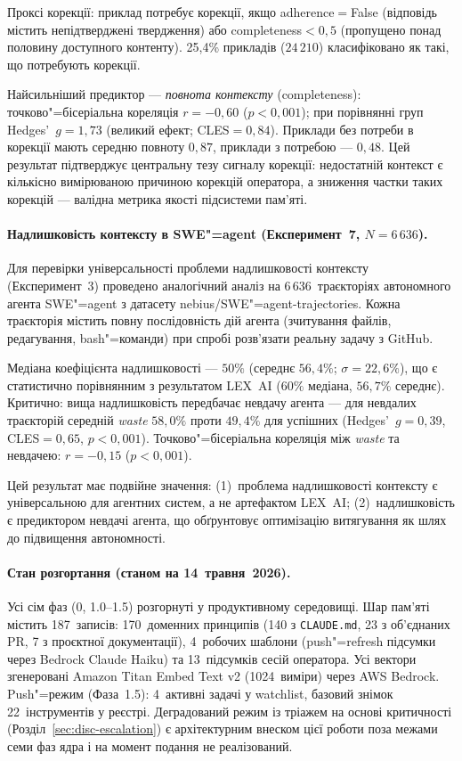 \documentclass[11pt]{article}
\begin{document}
Проксі корекції: приклад потребує корекції, якщо adherence${=}$False (відповідь містить непідтверджені твердження) або completeness${<}0{,}5$ (пропущено понад половину доступного контенту).
25{,}4\% прикладів ($24\,210$) класифіковано як такі, що потребують корекції.

Найсильніший предиктор --- \emph{повнота контексту} (completeness): точково"=бісеріальна кореляція $r{=}{-}0{,}60$ ($p{<}0{,}001$); при порівнянні груп Hedges'~$g{=}1{,}73$ (великий ефект; CLES${=}0{,}84$).
Приклади без потреби в корекції мають середню повноту $0{,}87$, приклади з потребою --- $0{,}48$.
Цей результат підтверджує центральну тезу сигналу корекції: недостатній контекст є кількісно вимірюваною причиною корекцій оператора, а зниження частки таких корекцій --- валідна метрика якості підсистеми пам'яті.

\paragraph{Надлишковість контексту в SWE"=agent (Експеримент~7, $N{=}6\,636$).}
Для перевірки універсальності проблеми надлишковості контексту (Експеримент~3) проведено аналогічний аналіз на 6\,636~траєкторіях автономного агента SWE"=agent з датасету nebius/SWE"=agent-trajectories.
Кожна траєкторія містить повну послідовність дій агента (зчитування файлів, редагування, bash"=команди) при спробі розв'язати реальну задачу з GitHub.

Медіана коефіцієнта надлишковості --- $50\%$ (середнє $56{,}4\%$; $\sigma{=}22{,}6\%$), що є статистично порівнянним з результатом LEX~AI ($60\%$ медіана, $56{,}7\%$ середнє).
Критично: вища надлишковість передбачає невдачу агента --- для невдалих траєкторій середній \emph{waste} $58{,}0\%$ проти $49{,}4\%$ для успішних (Hedges'~$g{=}0{,}39$, CLES${=}0{,}65$, $p{<}0{,}001$).
Точково"=бісеріальна кореляція між \emph{waste} та невдачею: $r{=}{-}0{,}15$ ($p{<}0{,}001$).

Цей результат має подвійне значення: (1)~проблема надлишковості контексту є універсальною для агентних систем, а не артефактом LEX~AI; (2)~надлишковість є предиктором невдачі агента, що обґрунтовує оптимізацію витягування як шлях до підвищення автономності.

\paragraph{Стан розгортання (станом на 14~травня~2026).}
Усі сім фаз (0, 1.0--1.5) розгорнуті у продуктивному середовищі.
Шар пам'яті містить 187~записів: 170~доменних принципів (140 з \texttt{CLAUDE.md}, 23 з об'єднаних PR, 7 з проєктної документації), 4~робочих шаблони (push"=refresh підсумки через Bedrock Claude Haiku) та 13~підсумків сесій оператора.
Усі вектори згенеровані Amazon Titan Embed Text v2 (1024~виміри) через AWS Bedrock.
Push"=режим (Фаза~1.5): 4~активні задачі у watchlist, базовий знімок 22~інструментів у реєстрі.
Деградований режим із тріажем на основі критичності (Розділ~\ref{sec:disc-escalation}) є архітектурним внеском цієї роботи поза межами семи фаз ядра і на момент подання не реалізований.
\end{document}

